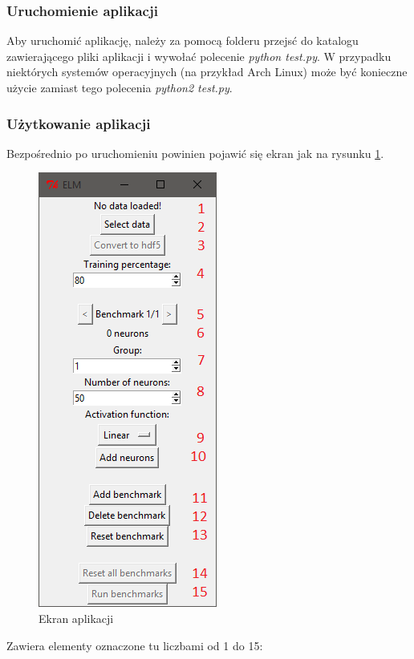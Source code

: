 \documentclass{article}
\begin{document}
\subsubsection*{Uruchomienie aplikacji}
Aby uruchomić aplikację, należy za pomocą folderu przejsć do katalogu zawierającego pliki aplikacji i wywołać polecenie \textit{python test.py}. W przypadku niektórych systemów operacyjnych (na przykład Arch Linux) może być konieczne użycie zamiast tego polecenia \textit{python2 test.py}.
\subsubsection*{Użytkowanie aplikacji}
Bezpośrednio po uruchomieniu powinien pojawić się ekran jak na rysunku \ref{python_ekran}.
\begin{figure}[H]
\centering
\includegraphics{instrukcja_python_start.png}
\caption{Ekran aplikacji}
\label{python_ekran}
\end{figure}
Zawiera elementy oznaczone tu liczbami od 1 do 15:
\end{document}
